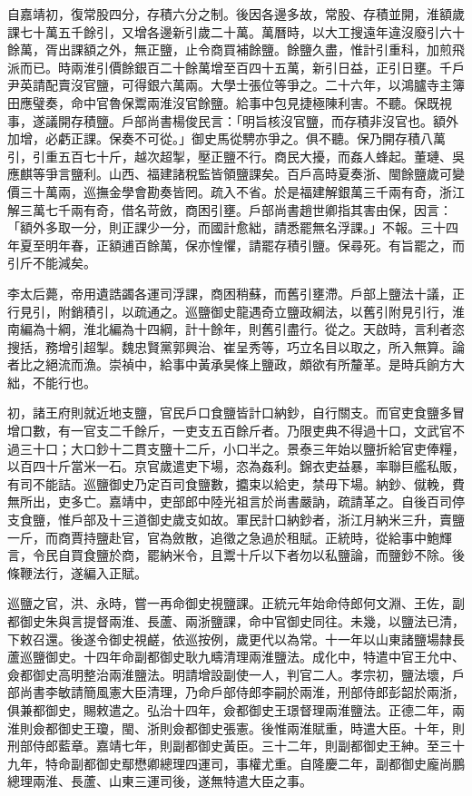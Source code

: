 自嘉靖初，復常股四分，存積六分之制。後因各邊多故，常股、存積並開，淮額歲課七十萬五千餘引，又增各邊新引歲二十萬。萬曆時，以大工搜遠年違沒廢引六十餘萬，胥出課額之外，無正鹽，止令商買補餘鹽。餘鹽久盡，惟計引重科，加煎飛派而已。時兩淮引價餘銀百二十餘萬增至百四十五萬，新引日益，正引日壅。千戶尹英請配賣沒官鹽，可得銀六萬兩。大學士張位等爭之。二十六年，以鴻臚寺主簿田應璧奏，命中官魯保鬻兩淮沒官餘鹽。給事中包見捷極陳利害。不聽。保既視事，遂議開存積鹽。戶部尚書楊俊民言：「明旨核沒官鹽，而存積非沒官也。額外加增，必虧正課。保奏不可從。」御史馬從騁亦爭之。俱不聽。保乃開存積八萬引，引重五百七十斤，越次超掣，壓正鹽不行。商民大擾，而姦人蜂起。董璉、吳應麒等爭言鹽利。山西、福建諸稅監皆領鹽課矣。百戶高時夏奏浙、閩餘鹽歲可變價三十萬兩，巡撫金學會勘奏皆罔。疏入不省。於是福建解銀萬三千兩有奇，浙江解三萬七千兩有奇，借名苛斂，商困引壅。戶部尚書趙世卿指其害由保，因言：「額外多取一分，則正課少一分，而國計愈絀，請悉罷無名浮課。」不報。三十四年夏至明年春，正額逋百餘萬，保亦惶懼，請罷存積引鹽。保尋死。有旨罷之，而引斤不能減矣。

李太后薨，帝用遺誥蠲各運司浮課，商困稍蘇，而舊引壅滯。戶部上鹽法十議，正行見引，附銷積引，以疏通之。巡鹽御史龍遇奇立鹽政綱法，以舊引附見引行，淮南編為十綱，淮北編為十四綱，計十餘年，則舊引盡行。從之。天啟時，言利者恣搜括，務增引超掣。魏忠賢黨郭興治、崔呈秀等，巧立名目以取之，所入無算。論者比之絕流而漁。崇禎中，給事中黃承昊條上鹽政，頗欲有所釐革。是時兵餉方大絀，不能行也。

初，諸王府則就近地支鹽，官民戶口食鹽皆計口納鈔，自行關支。而官吏食鹽多冒增口數，有一官支二千餘斤，一吏支五百餘斤者。乃限吏典不得過十口，文武官不過三十口；大口鈔十二貫支鹽十二斤，小口半之。景泰三年始以鹽折給官吏俸糧，以百四十斤當米一石。京官歲遣吏下場，恣為姦利。錦衣吏益暴，率聯巨艦私販，有司不能詰。巡鹽御史乃定百司食鹽數，攟束以給吏，禁毋下場。納鈔、僦輓，費無所出，吏多亡。嘉靖中，吏部郎中陸光祖言於尚書嚴訥，疏請革之。自後百司停支食鹽，惟戶部及十三道御史歲支如故。軍民計口納鈔者，浙江月納米三升，賣鹽一斤，而商賈持鹽赴官，官為斂散，追徵之急過於租賦。正統時，從給事中鮑輝言，令民自買食鹽於商，罷納米令，且鬻十斤以下者勿以私鹽論，而鹽鈔不除。後條鞭法行，遂編入正賦。

巡鹽之官，洪、永時，嘗一再命御史視鹽課。正統元年始命侍郎何文淵、王佐，副都御史朱與言提督兩淮、長蘆、兩浙鹽課，命中官御史同往。未幾，以鹽法已清，下敕召還。後遂令御史視鹺，依巡按例，歲更代以為常。十一年以山東諸鹽場隸長蘆巡鹽御史。十四年命副都御史耿九疇清理兩淮鹽法。成化中，特遣中官王允中、僉都御史高明整治兩淮鹽法。明請增設副使一人，判官二人。孝宗初，鹽法壞，戶部尚書李敏請簡風憲大臣清理，乃命戶部侍郎李嗣於兩淮，刑部侍郎彭韶於兩浙，俱兼都御史，賜敕遣之。弘治十四年，僉都御史王璟督理兩淮鹽法。正德二年，兩淮則僉都御史王瓊，閩、浙則僉都御史張憲。後惟兩淮賦重，時遣大臣。十年，則刑部侍郎藍章。嘉靖七年，則副都御史黃臣。三十二年，則副都御史王紳。至三十九年，特命副都御史鄢懋卿總理四運司，事權尤重。自隆慶二年，副都御史龐尚鵬總理兩淮、長蘆、山東三運司後，遂無特遣大臣之事。

